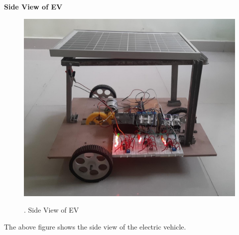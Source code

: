\documentclass[a4paper,12pt]{article}
\begin{document}
\newpage
\textbf{Side View of EV}\\[1cm]
\begin{figure}[!h]
\centering
\includegraphics[scale=0.3]{sv.jpeg}\\
\caption{. Side View of EV}
\end{figure}

The above figure shows the side view of the electric vehicle.

\newpage
\end{document}
